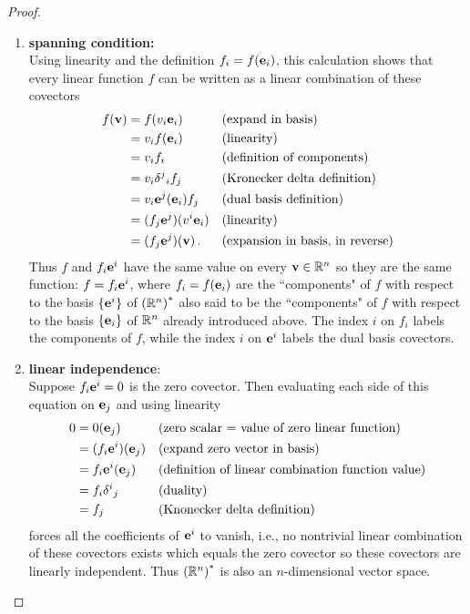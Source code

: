 \begin{proof}
\begin{enumerate}
\item
\textbf{ spanning condition:}\\
Using linearity and the definition $f_i=f(\mathbf{ e}_i)$, this calculation shows that every linear function $f$ can be written as a linear combination of these covectors
\begin{align*}
f(\mathbf{ v})&= f(v_i \mathbf{ e}_i) &&\text{(expand in basis)}
\\
&=v_i f(\mathbf{ e}_i) &&\text{(linearity)}
\\
&= v_i f_i &&\text{(definition of components)}
\\
&= v_i\delta^j{}_i f_j &&\text{(Kronecker delta definition)}
\\
&=v_i\mathbf{ e}^j(\mathbf{ e}_i) f_j&&\text{(dual basis definition)}
\\
&=(f_j\mathbf{ e}^j)(v^i \mathbf{ e}_i)&&\text{(linearity)}
\\
&=(f_j\mathbf{ e}^j)(\mathbf{ v}) \,. &&\text{(expansion in basis, in reverse)}
\end{align*}
Thus $f$ and $f_i\mathbf{ e}^i$ have the same value on every $\mathbf{ v} \in \mathbb{R}^n$ so they are the same function:
$f=f_i\mathbf{ e}^i$, where $f_i = f(\mathbf{ e}_i)$ are the
``components" of $f$ with respect to the basis $\{\mathbf{ e}^i\}$ of $\left(\mathbb{R}^n\right)^*$ also said to be the ``components" of $f$ with respect to the basis $\{\mathbf{ e}_i\}$ of $\mathbb{R}^n$ already introduced above. The index $i$ on $f_i$ labels the components of $f$, while the index $i$ on $\mathbf{ e}^i$ labels the dual basis covectors.
\item
\textbf{ linear independence}: \\
Suppose $f_i\mathbf{ e}^i=0$ is the zero covector.
Then evaluating each side of this equation on $\mathbf{ e}_j$ and using linearity
\begin{align*}
0 &= 0(\mathbf{ e}_j) &&\text{(zero scalar = value of zero linear function)}
\\
&= (f_i\mathbf{ e}^i)(\mathbf{ e}_j) &&\text{(expand zero vector in basis)}
\\
&= f_i\mathbf{ e}^i(\mathbf{ e}_j) &&\text{(definition of linear combination function value)}
\\
&= f_i\delta^i{}_j &&\text{(duality)}
\\
&= f_j &&\text{(Knonecker delta definition)}
\end{align*}
forces all the coefficients of $\mathbf{ e}^i$ to vanish, i.e., no nontrivial linear combination of these covectors exists which equals the zero covector so these covectors are linearly independent. Thus $\left(\mathbb{R}^n\right)^*$ is also an $n$-dimensional vector space. 
\end{enumerate}

\end{proof}


